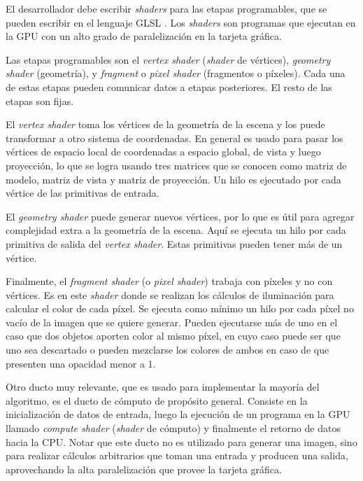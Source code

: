 El desarrollador debe escribir \textit{shaders} para las etapas programables, que se pueden escribir en el lenguaje GLSL \cite{glsl-spec}.
Los \textit{shaders} son programas que ejecutan en la GPU con un alto grado de paralelización en la tarjeta gráfica.

Las etapas programables son el \textit{vertex shader} (\textit{shader} de vértices), \textit{geometry shader} (geometría), y \textit{fragment} o \textit{pixel shader} (fragmentos o píxeles).
Cada una de estas etapas pueden comunicar datos a etapas posteriores.
El resto de las etapas son fijas.

El \textit{vertex shader} toma los vértices de la geometría de la escena y los puede transformar a otro sistema de coordenadas.
En general es usado para pasar los vértices de espacio local de coordenadas a espacio global, de vista y luego proyección, lo que se logra usando tres matrices que se conocen como matriz de modelo, matriz de vista y matriz de proyección.
Un hilo es ejecutado por cada vértice de las primitivas de entrada.

El \textit{geometry shader} puede generar nuevos vértices, por lo que es útil para agregar complejidad extra a la geometría de la escena.
Aquí se ejecuta un hilo por cada primitiva de salida del \textit{vertex shader}.
Estas primitivas pueden tener más de un vértice.

Finalmente, el \textit{fragment shader} (o \textit{pixel shader}) trabaja con píxeles y no con vértices.
Es en este \textit{shader} donde se realizan los cálculos de iluminación para calcular el color de cada píxel.
Se ejecuta como mínimo un hilo por cada píxel no vacío de la imagen que se quiere generar.
Pueden ejecutarse más de uno en el caso que dos objetos aporten color al mismo píxel, en cuyo caso puede ser que uno sea descartado o pueden mezclarse los colores de ambos en caso de que presenten una opacidad menor a 1.

Otro ducto muy relevante, que es usado para implementar la mayoría del algoritmo, es el ducto de cómputo de propósito general.
Consiste en la inicialización de datos de entrada, luego la ejecución de un programa en la GPU llamado \textit{compute shader} (\textit{shader} de cómputo) y finalmente el retorno de datos hacia la CPU.
Notar que este ducto no es utilizado para generar una imagen, sino para realizar cálculos arbitrarios que toman una entrada y producen una salida, aprovechando la alta paralelización que provee la tarjeta gráfica.

